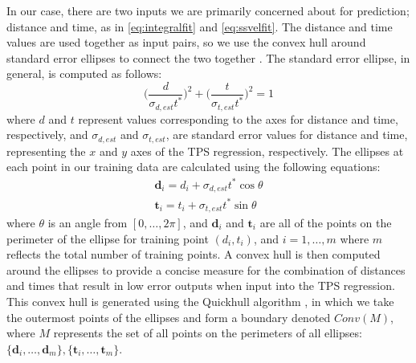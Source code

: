 \documentclass[letterpaper, 10 pt, conference]{ieeeconf}  %
\newcommand\NB[1]{$\spadesuit$\footnote{NB: #1}}
\begin{document}
In our case, there are two inputs we are primarily concerned about for prediction; distance and time, as in \eqref{eq:integralfit} and \eqref{eq:ssvelfit}. The distance and time values are used together as input pairs, so we use the convex hull around standard error ellipses to connect the two together \cite{stdellipse}. The standard error ellipse, in general, is computed as follows: %
\begin{equation}
    \bigg(\frac{d}{\sigma_{d,est}t^*}\bigg)^2 + \bigg(\frac{t}{\sigma_{t,est}t^*}\bigg)^2 = 1
\end{equation}
where $d$ and $t$ represent values corresponding to the axes for distance and time, respectively, and $\sigma_{d,est}$ and $\sigma_{t,est}$, are standard error values for distance and time, representing the $x$ and $y$ axes of the TPS regression, respectively. The ellipses at each point in our training data are calculated using the following equations:
\begin{align} \label{eq:bounds}
    \bm{d}_i = d_i + \sigma_{d,est}t^*\cos{\theta} \nonumber \\
    \bm{t}_i = t_i + \sigma_{t,est}t^*\sin{\theta} 
\end{align}
where $\theta$ is an angle from $[0,\ldots,2\pi]$, and $\bm{d}_i$ and $\bm{t}_i$ are all of the points on the perimeter of the ellipse for training point $(d_i,t_i)$, and $i = 1,\ldots,m$ where $m$ reflects the total number of training points. A convex hull is then computed around the ellipses to provide a concise measure for the combination of distances and times that result in low error outputs when input into the TPS regression. This convex hull is generated using the Quickhull algorithm \cite{quickhull}, in which we take the outermost points of the ellipses and form a boundary denoted $Conv(M)$, where $M$ represents the set of all points on the perimeters of all ellipses: $\{\bm{d}_i,\ldots,\bm{d}_m\},\{\bm{t}_i,\ldots,\bm{t}_m\}$.
\end{document}
